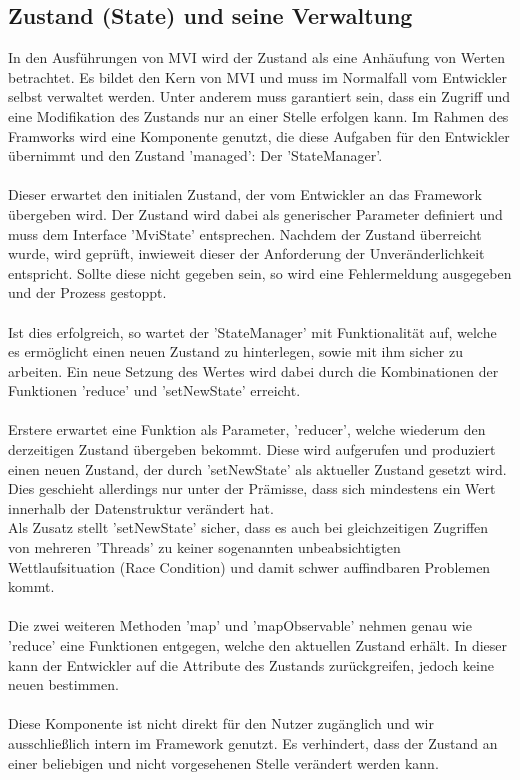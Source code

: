\subsection{Zustand (State) und seine Verwaltung}
In den Ausführungen von MVI wird der Zustand als eine Anhäufung von Werten betrachtet. Es bildet den Kern von MVI und muss im Normalfall vom Entwickler selbst verwaltet werden. Unter anderem muss garantiert sein, dass ein Zugriff und eine Modifikation des Zustands nur an einer Stelle erfolgen kann. Im Rahmen des Framworks wird eine Komponente genutzt, die diese Aufgaben für den Entwickler übernimmt und den Zustand 'managed': Der 'StateManager'.
\\\\
Dieser erwartet den initialen Zustand, der vom Entwickler an das Framework übergeben wird. Der Zustand wird dabei als generischer Parameter definiert und muss dem Interface 'MviState' entsprechen. Nachdem der Zustand überreicht wurde, wird geprüft, inwieweit dieser der Anforderung der Unveränderlichkeit entspricht. Sollte diese nicht gegeben sein, so wird eine Fehlermeldung ausgegeben und der Prozess gestoppt.
\\\\
Ist dies erfolgreich, so wartet der 'StateManager' mit Funktionalität auf, welche es ermöglicht einen neuen Zustand zu hinterlegen, sowie mit ihm sicher zu arbeiten. Ein neue Setzung des Wertes wird dabei durch die Kombinationen der Funktionen 'reduce' und 'setNewState' erreicht. 
\\\\
Erstere erwartet eine Funktion als Parameter, 'reducer', welche wiederum den derzeitigen Zustand übergeben bekommt. Diese wird aufgerufen und produziert einen neuen Zustand, der durch 'setNewState' als aktueller Zustand gesetzt wird. Dies geschieht allerdings nur unter der Prämisse, dass sich mindestens ein Wert innerhalb der Datenstruktur verändert hat.
\\
Als Zusatz stellt 'setNewState' sicher, dass es auch bei gleichzeitigen Zugriffen von mehreren 'Threads' zu keiner sogenannten unbeabsichtigten Wettlaufsituation (Race Condition) und damit schwer auffindbaren Problemen kommt.
\\\\
Die zwei weiteren Methoden 'map' und 'mapObservable' nehmen genau wie 'reduce' eine Funktionen entgegen, welche den aktuellen Zustand erhält. In dieser kann der Entwickler auf die Attribute des Zustands zurückgreifen, jedoch keine neuen bestimmen.
\\\\
Diese Komponente ist nicht direkt für den Nutzer zugänglich und wir ausschließlich intern im Framework genutzt. Es verhindert, dass der Zustand an einer beliebigen und nicht vorgesehenen Stelle verändert werden kann.

